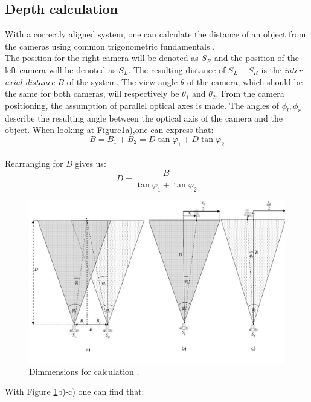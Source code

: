 \subsection{Depth calculation}
With a correctly aligned system, one can calculate the distance of an object from the cameras using common trigonometric fundamentals \cite{JernejMrovlje.2008,YasirDawoodSalman.2017}.
\\
The position for the right camera will be denoted as $S_{R}$ and the position of the left camera will be denoted as $S_{L}$. The resulting distance of $S_{L}-S_{R}$ is the \textit{inter-axial distance} $B$ of the system. The view angle $\theta$ of the camera, which should be the same for both cameras, will respectively be $\theta_{1}$ and $\theta_{2}$. From the camera positioning, the assumption of parallel optical axes is made. The angles of $\phi_{l},\phi_{r}$ describe the resulting angle between the optical axis of the camera and the object.
When looking at Figure\ref{stereo_Dimmensions}a),one can express that:\\
\begin{equation}
B= B_{1}+B_{2}=D\tan\varphi_{1}+D\tan\varphi_{2}
\end{equation}\\
Rearranging for \textit{D} gives us:\\
\begin{equation}
D = \frac{B}{\tan\varphi_{1}+\tan\varphi_{2}}
\end{equation}
\begin{figure}[H]
\includegraphics[width=\textwidth]{images/Stereo_Calc_4.JPG}
\caption{Dimmensions for calculation \cite{JernejMrovlje.2008}.}
\label{stereo_Dimmensions} 
\end{figure}
With Figure \ref{stereo_Dimmensions}b)-c) one can find that:
